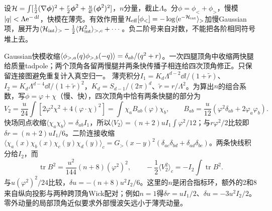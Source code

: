 \label{ch:wilson}
设$\mathcal H=\int[\frac12(\nabla\boldsymbol{\phi})^2+\frac r2\boldsymbol{\phi}^2+\frac u{4!}(\boldsymbol{\phi}^2)^2]$，$n$分量，截止$\Lambda$。分$\phi=\phi_<+\phi_>$，慢模$|q|<\Lambda\mathrm e^{-\,\mathrm d l}$，快模在薄壳。有效作用量$\mathcal H_{\rm eff}[\phi_<]=-\log\langle \mathrm e^{-\mathcal H_{\mathrm{int}}}\rangle_>$加慢Gaussian项，展开为$\langle \mathcal H_{\mathrm{int}}\rangle_>-\frac12\langle \mathcal H_{\mathrm{int}}^2\rangle_{>,c}+\cdots$。负二阶号来自对数，不能把各阶相同符号堆上去。

Gaussian快模收缩$\langle \phi_{>,a}(q)\phi_{>,b}(-q)\rangle=\delta_{ab}/(q^2+r)$。一次四腿顶角中收缩两快腿给质量tadpole；两个顶角各留两慢腿并两条快传播子相连给四次顶角修正。只保留连接图避免重复计入真空归一。
薄壳积分$I_1=K_d\Lambda^{d-2}\dd l/(1+\widetilde r)$、$I_2=K_d\Lambda^{d-4}\dd l/(1+\widetilde r)^2$，$K_d=S_{d-1}/(2\pi)^d$、$\widetilde r=r/\Lambda^2$。为算出$n$的组合系数，写$\phi=\varphi+\chi$（慢、快），四次顶角中恰有两条快腿的部分为
\begin{equation}
V_2=\frac u{24}\int[2\varphi^2\chi^2+4(\varphi\cdot\chi)^2]
=\int\chi_a B_{ab}(\varphi)\chi_b,\qquad
B_{ab}=\frac u{12}(\varphi^2\delta_{ab}+2\varphi_a\varphi_b).
\end{equation}
快场同点收缩$\langle\chi_a\chi_b\rangle=\delta_{ab}I_1$，所以$\langle V_2\rangle=(n+2)uI_1\int\varphi^2/12$；与$r\varphi^2/2$比较即$\delta r=(n+2)uI_1/6$。二阶连接收缩$\langle\chi_a(x)\chi_b(x)\chi_c(y)\chi_d(y)\rangle_c=G_>(x-y)^2(\delta_{ac}\delta_{bd}+\delta_{ad}\delta_{bc})$。两条快线积分给$I_2$，而
\begin{equation}
\operatorname{tr}B^2=\frac{u^2}{144}(n+8)(\varphi^2)^2,\qquad
-\frac12\langle V_2^2\rangle_c=-I_2\int\operatorname{tr}B^2.
\end{equation}
与$u(\varphi^2)^2/24$比较，$\delta u=-(n+8)u^2I_2/6$。这里的$n$是闭合指标环，额外的2和8来自纵向投影与两种跨顶角Wick配对；例如$n=1$得$\delta r=uI_1/2$、$\delta u=-3u^2I_2/2$。零外动量的局部顶角近似要求外部慢波矢远小于薄壳动量。

